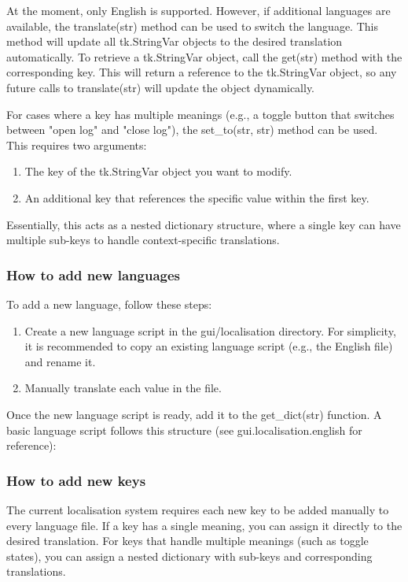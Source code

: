 \documentclass{article}
\begin{document}
At the moment, only English is supported. However, if additional languages are available, the translate(str) method can be used to switch the language. This method will update all tk.StringVar objects to the desired translation automatically. To retrieve a tk.StringVar object, call the get(str) method with the corresponding key. This will return a reference to the tk.StringVar object, so any future calls to translate(str) will update the object dynamically.

For cases where a key has multiple meanings (e.g., a toggle button that switches between "open log" and "close log"), the set\_to(str, str) method can be used. This requires two arguments:
\begin{enumerate}
    \item The key of the tk.StringVar object you want to modify.
    \item An additional key that references the specific value within the first key.
\end{enumerate}

Essentially, this acts as a nested dictionary structure, where a single key can have multiple sub-keys to handle context-specific translations.

\subsubsection{How to add new languages}
To add a new language, follow these steps:
\begin{enumerate}
    \item Create a new language script in the gui/localisation directory. For simplicity, it is recommended to copy an existing language script (e.g., the English file) and rename it.
    \item Manually translate each value in the file.
\end{enumerate}

Once the new language script is ready, add it to the get\_dict(str) function. A basic language script follows this structure (see gui.localisation.english for reference):



\subsubsection{How to add new keys}
The current localisation system requires each new key to be added manually to every language file. If a key has a single meaning, you can assign it directly to the desired translation. For keys that handle multiple meanings (such as toggle states), you can assign a nested dictionary with sub-keys and corresponding translations.
\end{document}
